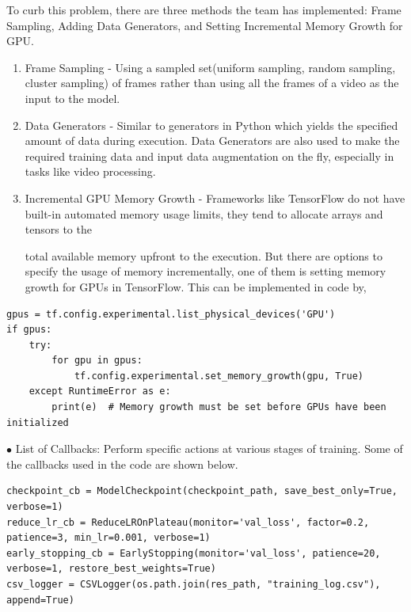 \noindent To curb this problem, there are three methods the team has implemented: Frame Sampling, Adding Data Generators, and Setting Incremental Memory Growth for GPU.

\vspace{-5mm}

\begin{enumerate}

    \item Frame Sampling - Using a sampled set(uniform sampling, random sampling, cluster sampling) of frames rather than using all the frames of a video as the input to the model.

    \item Data Generators - Similar to generators in Python which yields the specified amount of data during execution. Data Generators are also used to make the required training data and input data augmentation on the fly, especially in tasks like video processing.

    \item Incremental GPU Memory Growth - Frameworks like TensorFlow do not have built-in automated memory usage limits, they tend to allocate arrays and tensors to the

\clearpage
    
    total available memory upfront to the execution. But there are options to specify the usage of memory incrementally, one of them is setting memory growth for GPUs in TensorFlow. This can be implemented in code by,
\end{enumerate}


\begin{lstlisting}
gpus = tf.config.experimental.list_physical_devices('GPU')
if gpus:
    try:
        for gpu in gpus:
            tf.config.experimental.set_memory_growth(gpu, True)
    except RuntimeError as e:
        print(e)  # Memory growth must be set before GPUs have been initialized
\end{lstlisting}


\noindent $\bullet$ List of Callbacks: Perform specific actions at various stages of training. Some of the callbacks used in the code are shown below.

\begin{lstlisting}
checkpoint_cb = ModelCheckpoint(checkpoint_path, save_best_only=True, verbose=1)
reduce_lr_cb = ReduceLROnPlateau(monitor='val_loss', factor=0.2, patience=3, min_lr=0.001, verbose=1)
early_stopping_cb = EarlyStopping(monitor='val_loss', patience=20, verbose=1, restore_best_weights=True)
csv_logger = CSVLogger(os.path.join(res_path, "training_log.csv"), append=True)
\end{lstlisting}

